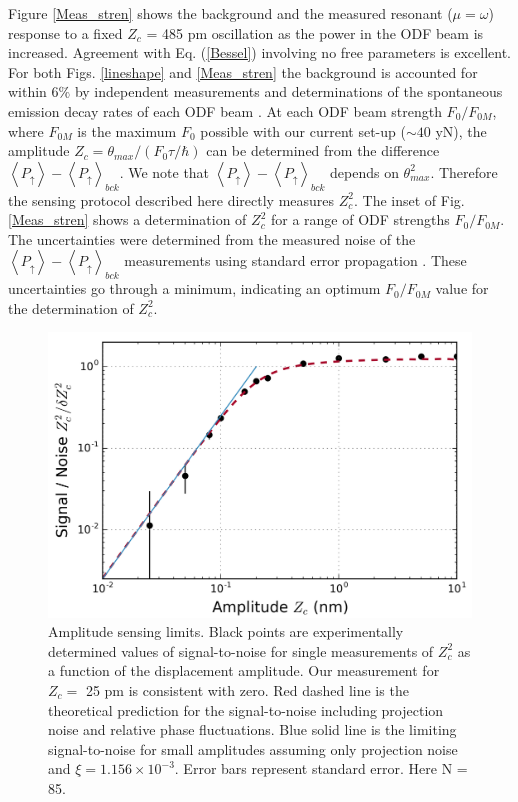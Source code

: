 \documentclass[aps,prl,twocolumn,superscriptaddress,floatfix]{revtex4-1}
\begin{document}
Figure \ref{Meas_stren} shows the background and the measured resonant ($\mu=\omega$) response to a fixed $Z_c$ = 485 pm oscillation as the power in the ODF beam is increased. Agreement with Eq. (\ref{Bessel}) involving no free parameters is excellent. For both Figs. \ref{lineshape} and \ref{Meas_stren} the background is accounted for within $6\%$ by independent measurements and determinations of the spontaneous emission decay rates of each ODF beam \citep{Britton2012}. At each ODF beam strength $F_{0}/F_{0M}$, where $F_{0M}$ is the maximum $F_0$ possible with our current set-up ($\sim 40$ yN), the amplitude $Z_c=\theta_{max}/(F_{0}\tau/\hbar)$ can be determined from the difference $\left< P_\uparrow \right>- \left< P_\uparrow \right>_{bck}$. We note that $\left< P_\uparrow \right>- \left< P_\uparrow \right>_{bck}$ depends on $\theta_{max}^2$. Therefore the sensing protocol described here directly measures $Z_c^2$. The inset of Fig. \ref{Meas_stren} shows a determination of $Z_c^2$ for a range of ODF strengths $F_{0}/F_{0M}$. The uncertainties were determined from the measured noise of the $\left< P_\uparrow \right>- \left< P_\uparrow \right>_{bck}$ measurements using standard error propagation \citep{SuppMat}. These uncertainties go through a minimum, indicating an optimum $F_{0}/F_{0M}$ value for the determination of $Z_c^2$.

\begin{figure}
\includegraphics[width=.45\textwidth]{sensing_limit}
\caption{Amplitude sensing limits. Black points are experimentally determined values of signal-to-noise for single measurements of $Z_{c}^{2}$ as a function of the displacement amplitude. Our measurement for $Z_c =$ 25 pm is consistent with zero. Red dashed line is the theoretical prediction for the signal-to-noise including projection noise and relative phase fluctuations. Blue solid line is the limiting signal-to-noise for small amplitudes assuming only projection noise and $\xi=1.156\times10^{-3}$. Error bars represent standard error. Here N = 85.}\label{Fig_sens}
\end{figure}
\end{document}
